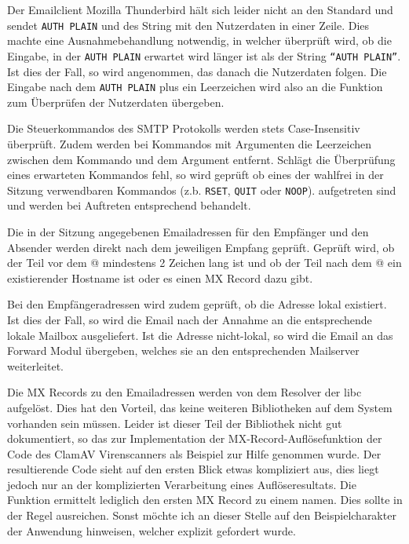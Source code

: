 \documentclass[final,a4paper,11pt,notitlepage,halfparskip]{scrreprt}
\begin{document}
Der Emailclient Mozilla Thunderbird hält sich leider nicht an den Standard und
sendet \texttt{AUTH PLAIN} und des String mit den Nutzerdaten in einer Zeile.
Dies machte eine Ausnahmebehandlung notwendig, in welcher überprüft wird, ob die
Eingabe, in der \texttt{AUTH PLAIN} erwartet wird länger ist als der String
\texttt{"`AUTH PLAIN"'}. Ist dies der Fall, so wird angenommen, das danach die
Nutzerdaten folgen. Die Eingabe nach dem \texttt{AUTH PLAIN} plus ein
Leerzeichen wird also an die Funktion zum Überprüfen der Nutzerdaten übergeben.

Die Steuerkommandos des SMTP Protokolls werden stets Case-Insensitiv überprüft.
Zudem werden bei Kommandos mit Argumenten die Leerzeichen zwischen dem Kommando
und dem Argument entfernt. Schlägt die Überprüfung eines erwarteten Kommandos
fehl, so wird geprüft ob eines der wahlfrei in der Sitzung verwendbaren
Kommandos (z.b. \texttt{RSET}, \texttt{QUIT} oder \texttt{NOOP}). aufgetreten
sind und werden bei Auftreten entsprechend behandelt.

Die in der Sitzung angegebenen Emailadressen für den Empfänger und den Absender
werden direkt nach dem jeweiligen Empfang geprüft. Geprüft wird, ob der Teil vor
dem @ mindestens 2 Zeichen lang ist und ob der Teil nach dem @ ein existierender
Hostname ist oder es einen MX Record dazu gibt. 

Bei den Empfängeradressen wird zudem geprüft, ob die Adresse lokal existiert.
Ist dies der Fall, so wird die Email nach der Annahme an die entsprechende
lokale Mailbox ausgeliefert. Ist die Adresse nicht-lokal, so wird die Email an
das Forward Modul übergeben, welches sie an den entsprechenden Mailserver
weiterleitet.

Die MX Records zu den Emailadressen werden von dem Resolver der libc aufgelöst.
Dies hat den Vorteil, das keine weiteren Bibliotheken auf dem System vorhanden
sein müssen. Leider ist dieser Teil der Bibliothek nicht gut dokumentiert, so
das zur Implementation der MX-Record-Auflösefunktion der Code des ClamAV
Virenscanners als Beispiel zur Hilfe genommen wurde. Der resultierende Code
sieht auf den ersten Blick etwas kompliziert aus, dies liegt jedoch nur an der
komplizierten Verarbeitung eines Auflöseresultats. Die Funktion ermittelt
lediglich den ersten MX Record zu einem namen. Dies sollte in der Regel
ausreichen. Sonst möchte ich an dieser Stelle auf den Beispielcharakter der
Anwendung hinweisen, welcher explizit gefordert wurde.
\end{document}
